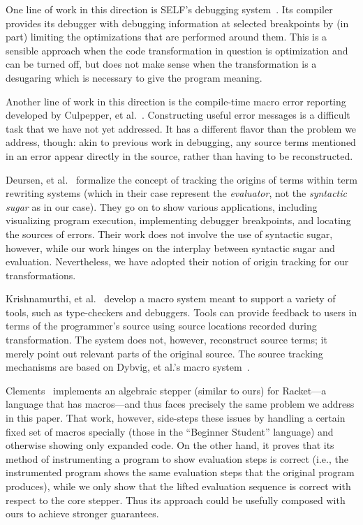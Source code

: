 One line of work in this direction is SELF's debugging
system~\cite{self-debugging}. Its compiler provides its debugger with
debugging information at selected breakpoints by (in part) limiting the
optimizations that are performed around them. This is a sensible approach
when the code transformation in question is optimization and can be turned
off, but does not make sense when the transformation is a desugaring
which is necessary to give the program meaning.

Another line of work in this direction is the compile-time macro error
reporting developed by Culpepper, et al.~\cite{fortifying-macros}.
Constructing useful error messages is a difficult task that we have not
yet addressed. It has a different flavor than the problem we address,
though: akin to previous work in debugging, any source terms mentioned in
an error appear directly in the source, rather than having to be
reconstructed.

Deursen, et al.~\cite{deursen:origin-tracking} formalize the concept of
tracking the origins
of terms within term rewriting systems (which in their case represent
the \emph{evaluator}, not the \emph{syntactic sugar} as in our
case). They go on to show various applications, including
visualizing program execution, implementing debugger breakpoints,
and locating the sources of errors.
Their work does not involve the use of syntactic sugar,
however, while our work hinges on the interplay between syntactic
sugar and evaluation. Nevertheless, we
have adopted their notion of origin tracking for our transformations.

Krishnamurthi, et al.~\cite{sk:mcmicmac} develop a macro system meant
to support a variety of tools, such as type-checkers and
debuggers. Tools can provide feedback to users in terms of the
programmer's source using source locations recorded during
transformation. The system does not, however, reconstruct source
terms; it merely point out relevant parts of the original source.  The
source tracking mechanisms are based on Dybvig, et al.'s macro
system~\cite{expansion-passing-style}.

Clements~\cite[page 53]{clements:thesis} implements an algebraic
stepper (similar to ours) for Racket---a language that has
macros---and thus faces precisely the same problem we address in this
paper. That work, however, side-steps these issues by handling a
certain fixed set of macros specially (those in the ``Beginner
Student'' language) and otherwise showing only expanded code.
On the other hand, it proves that its method of instrumenting a program to
show evaluation steps is correct (i.e., the instrumented program shows the
same evaluation steps that the original program produces),
while we only show that the lifted evaluation sequence is correct
with respect to the core stepper. Thus its approach could be
usefully composed with ours to achieve stronger guarantees.

